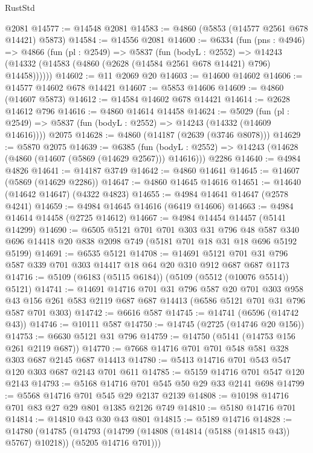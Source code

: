 \begin{lexlean}{RustStd}
\begin{coremodule}
    @2081
@14577 := @14548 @2081
@14583 := @4860 (@5853 (@14577 @2561 @678 @14421) @5873)
@14584 := @14556 @2081
@14600 := @6334
    (fun (pns : @4946) =>
    @4866
      (fun (pl : @2549) =>
      @5837
        (fun (bodyL : @2552) =>
        @14243 (@14332 (@14583 (@4860 (@2628 (@14584 @2561 @678 @14421) @796) @14458))))))
@14602 := @11 @2069 @20
@14603 := @14600 @14602
@14606 := @14577 @14602 @678 @14421
@14607 := @5853 @14606
@14609 := @4860 (@14607 @5873)
@14612 := @14584 @14602 @678 @14421
@14614 := @2628 @14612 @796
@14616 := @4860 @14614 @14458
@14624 := @5029
    (fun (pl : @2549) => @5837 (fun (bodyL : @2552) => @14243 (@14332 (@14609 @14616))))
    @2075
@14628 := @4860 (@14187 (@2639 (@3746 @8078)))
@14629 := @5870 @2075
@14639 := @6385
    (fun (bodyL : @2552) => @14243 (@14628 (@4860 (@14607 (@5869 (@14629 @2567))) @14616)))
    @2286
@14640 := @4984 @4826
@14641 := @14187 @3749
@14642 := @4860 @14641
@14645 := @14607 (@5869 (@14629 @2286))
@14647 := @4860 @14645 @14616
@14651 := @14640 (@14642 @14647) (@4322 @4823)
@14655 := @4984 @14641 @14647 (@2578 @4241)
@14659 := @4984 @14645 @14616 (@6419 @14606)
@14663 := @4984 @14614 @14458 (@2725 @14612)
@14667 := @4984 @14454 @14457 (@5141 @14299)
@14690 := @6505
    @5121
    @701
    @701
    @303
    @31
    @796
    @48
    @587
    @340
    @696
    @14418
    @20
    @838
    @2098
    @749
    (@5181 @701 @18 @31 @18 @696 @5192 @5199)
@14691 := @6535 @5121
@14708 := @14691
    @5121
    @701
    @31
    @796
    @587
    @339
    @701
    @303
    @14417
    @18
    @64
    @20
    @310
    @912
    @687
    @687
    @1173
@14716 := @5109 (@6183 (@5115 @6184)) (@5109 (@5512 (@10076 @5514)) @5121)
@14741 := @14691
    @14716
    @701
    @31
    @796
    @587
    @20
    @701
    @303
    @958
    @43
    @156
    @261
    @583
    @2119
    @687
    @687
    @14413
    (@6586 @5121 @701 @31 @796 @587 @701 @303)
@14742 := @6616 @587
@14745 := @14741 (@6596 (@14742 @43))
@14746 := @10111 @587
@14750 := @14745 (@2725 (@14746 @20 @156))
@14753 := @6630 @5121 @31 @796
@14759 := @14750 (@5141 (@14753 @156 @261 @2119 @687))
@14770 := @7668 @14716 @701 @701 @548 @581 @328 @303 @687 @2145 @687 @14413
@14780 := @5413 @14716 @701 @543 @547 @120 @303 @687 @2143 @701 @611
@14785 := @5159 @14716 @701 @547 @120 @2143
@14793 := @5168 @14716 @701 @545 @50 @29 @33 @2141 @698
@14799 := @5568 @14716 @701 @545 @29 @2137 @2139
@14808 := @10198 @14716 @701 @83 @27 @29 @801 @1385 @2126 @749
@14810 := @5180 @14716 @701
@14814 := @14810 @43 @30 @43 @801
@14815 := @5189 @14716
@14828 := @14780
    (@14785
      (@14793 (@14799 (@14808 (@14814 (@5188 (@14815 @43)) @5767) @10218)) (@5205 @14716 @701)))

\end{coremodule}
\end{lexlean}
